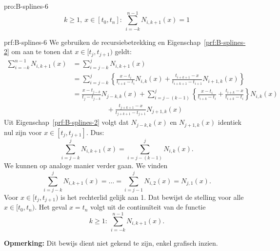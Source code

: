 \begin{pro}[B-spline]{pro:B-splines-6}
    \begin{equation*}
        k \geq 1,\ x \in [t_0,t_n]:\ \sum_{i=-k}^{n-1} N_{i, k+1}(x) = 1
    \end{equation*}
    \vspace{-0.2cm}
\end{pro}

\begin{prf}[B-spline]{prf:B-splines-6}
    We gebruiken de recursiebetrekking en Eigenschap~\ref{prf:B-splines-2} om aan te tonen dat $x \in [t_j,t_{j+1})$ geldt:
    \begin{align*}
        \sum_{i=-k}^{n-1} N_{i, k+1}(x) 
            &= \sum_{i=j-k}^{j} N_{i, k+1}(x) \\
            &= \sum_{i=j-k}^{j} \left\{
                \frac{x-t_i}{t_{i+k} - t_i} N_{i,k}(x) + \frac{t_{i+k+1}-x}{t_{i+k+1}-t_{i+1}} N_{i+1,k}(x)
            \right\} \\
            &= \frac{x - t_{j-k}}{t_j - t_{j-k}} N_{j-k,k}(x) 
                + \sum_{i=j-(k-1)}^j \left\{
                \frac{x-t_i}{t_{i+k} - t_i} + \frac{t_{i+k}-x}{t_{i+k}-t_{i}}
                    \right\} N_{i,k}(x) \\
                &\quad \quad \quad \quad \quad + \frac{t_{j+k+1}-x}{t_{j+k+1}-t_{j+1}} N_{j+1,k}(x) 
    \end{align*}
    Uit Eigenschap~\ref{prf:B-splines-2} volgt dat $N_{j-k,k}(x)$ en $N_{j+1,k}(x)$ identiek nul zijn voor $x \in [t_j,t_{j+1}]$. Dus:
    \begin{equation*}
        \sum_{i=j-k}^{j} N_{i,k+1}(x) = \sum_{i=j-(k-1)}^j N_{i,k}(x).
    \end{equation*} 
    We kunnen op analoge manier verder gaan. We vinden 
    \begin{equation*}
        \sum_{i=j-k}^j N_{i,k+1}(x) = \ldots = \sum_{i=j-1}^{j} N_{i,2}(x) = N_{j,1}(x).
    \end{equation*}
    Voor $x\in[t_j,t_{j+1})$ is het rechterlid gelijk aan 1. Dat bewijst de stelling voor alle $x\in[t_0,t_n)$. Het geval $x = t_n$ volgt uit de continuïteit van de functie
    \begin{equation*}
        k \geq 1:\ \sum_{i=-k}^{n-1} N_{i, k+1}(x).
    \end{equation*}

    \textbf{Opmerking:}  Dit bewijs dient niet gekend te zijn, enkel grafisch inzien.
\end{prf}

